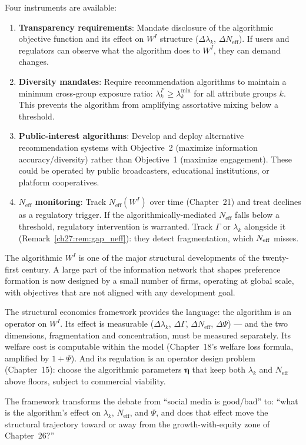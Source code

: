 \documentclass[../structural_economics_book.tex]{subfiles}
\begin{document}
\begin{remark}\label{ch27:prop:regulation}
Four instruments are available:
\begin{enumerate}
\item \textbf{Transparency requirements}: Mandate disclosure of the algorithmic objective function and its effect on $W^I$ structure ($\Delta\lambda_k$, $\Delta N_{\text{eff}}$). If users and regulators can observe what the algorithm does to $W^I$, they can demand changes.

\item \textbf{Diversity mandates}: Require recommendation algorithms to maintain a minimum cross-group exposure ratio: $\lambda_k^{I'} \geq \lambda_k^{\min}$ for all attribute groups $k$. This prevents the algorithm from amplifying assortative mixing below a threshold.

\item \textbf{Public-interest algorithms}: Develop and deploy alternative recommendation systems with Objective~2 (maximize information accuracy/diversity) rather than Objective~1 (maximize engagement). These could be operated by public broadcasters, educational institutions, or platform cooperatives.

\item \textbf{$N_{\text{eff}}$ monitoring}: Track $N_{\text{eff}}(W^I)$ over time (Chapter~21) and treat declines as a regulatory trigger. If the algorithmically-mediated $N_{\text{eff}}$ falls below a threshold, regulatory intervention is warranted. Track $\Gamma$ or $\lambda_k$ alongside it (Remark~\ref{ch27:rem:gap_neff}): they detect fragmentation, which $N_{\text{eff}}$ misses.
\end{enumerate}
\end{remark}

\begin{keyinsight}
The algorithmic $W^I$ is one of the major structural developments of the twenty-first century. A large part of the information network that shapes preference formation is now designed by a small number of firms, operating at global scale, with objectives that are not aligned with any development goal.

The structural economics framework provides the language: the algorithm is an operator on $W^I$. Its effect is measurable ($\Delta\lambda_k$, $\Delta\Gamma$, $\Delta N_{\text{eff}}$, $\Delta\Psi$) --- and the two dimensions, fragmentation and concentration, must be measured separately. Its welfare cost is computable within the model (Chapter~18's welfare loss formula, amplified by $1 + \Psi$). And its regulation is an operator design problem (Chapter~15): choose the algorithmic parameters $\boldsymbol{\eta}$ that keep both $\lambda_k$ and $N_{\text{eff}}$ above floors, subject to commercial viability.

The framework transforms the debate from ``social media is good/bad'' to: ``what is the algorithm's effect on $\lambda_k$, $N_{\text{eff}}$, and $\Psi$, and does that effect move the structural trajectory toward or away from the growth-with-equity zone of Chapter~26?''
\end{keyinsight}
\end{document}
